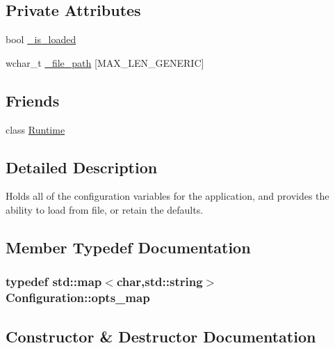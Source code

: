 \subsection*{Private Attributes}
\begin{DoxyCompactItemize}
\item 
bool \hyperlink{class_configuration_ad1188017dffdee79cee71bd3eddf8d96}{\-\_\-is\-\_\-loaded}
\item 
wchar\-\_\-t \hyperlink{class_configuration_adc160577cbe5851fbdf3e1bef18d288e}{\-\_\-file\-\_\-path} \mbox{[}M\-A\-X\-\_\-\-L\-E\-N\-\_\-\-G\-E\-N\-E\-R\-I\-C\mbox{]}
\end{DoxyCompactItemize}
\subsection*{Friends}
\begin{DoxyCompactItemize}
\item 
class \hyperlink{class_configuration_af3d14e26ba8af9e6cc5a32aad8446de7}{Runtime}
\end{DoxyCompactItemize}


\subsection{Detailed Description}
Holds all of the configuration variables for the application, and provides the ability to load from file, or retain the defaults. 

\subsection{Member Typedef Documentation}
\subsubsection[{opts\-\_\-map}]{\setlength{\rightskip}{0pt plus 5cm}typedef std\-::map$<$char,std\-::string$>$ {\bf Configuration\-::opts\-\_\-map}}\label{class_configuration_a70a439c19649766a6bb0f02656d1b7ce}


\subsection{Constructor \& Destructor Documentation}
